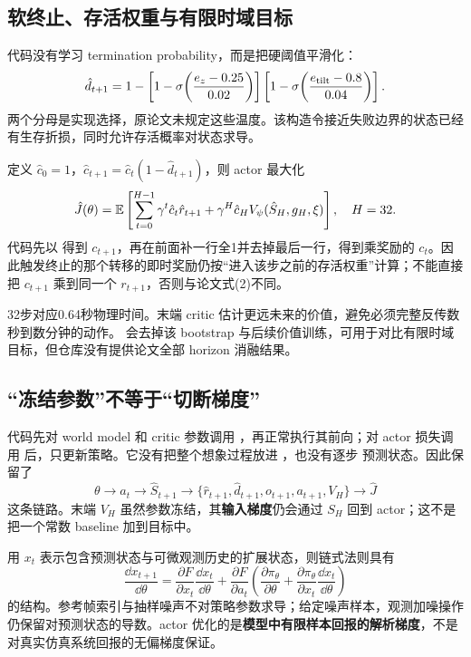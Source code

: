 \subsection{软终止、存活权重与有限时域目标}
代码没有学习 termination probability，而是把硬阈值平滑化：
\begin{equation}
 \hat d_{t+1}=1-
 \left[1-\sigma\!\left(\frac{e_z-0.25}{0.02}\right)\right]
 \left[1-\sigma\!\left(\frac{e_{\rm tilt}-0.8}{0.04}\right)\right].
\end{equation}
两个分母是实现选择，原论文未规定这些温度。该构造令接近失败边界的状态已经有生存折损，同时允许存活概率对状态求导。

定义 $\hat c_0=1$，$\hat c_{t+1}=\hat c_t(1-\hat d_{t+1})$，则 actor 最大化
\begin{equation}\label{eq:actor}
 \hat J(\theta)=\mathbb{E}\left[\sum_{t=0}^{H-1}\gamma^t\hat c_t\hat r_{t+1}
 +\gamma^H\hat c_H V_\psi(\hat S_H,g_H,\xi)\right],\quad H=32.
\end{equation}
代码先以  得到 $c_{t+1}$，再在前面补一行全1并去掉最后一行，得到乘奖励的 $c_t$。因此触发终止的那个转移的即时奖励仍按“进入该步之前的存活权重”计算；不能直接把 $c_{t+1}$ 乘到同一个 $r_{t+1}$，否则与论文式(2)不同。

32步对应0.64秒物理时间。末端 critic 估计更远未来的价值，避免必须完整反传数秒到数分钟的动作。 会去掉该 bootstrap 与后续价值训练，可用于对比有限时域目标，但仓库没有提供论文全部 horizon 消融结果。

\subsection{“冻结参数”不等于“切断梯度”}
代码先对 world model 和 critic 参数调用 ，再正常执行其前向；对 actor 损失调用  后，只更新策略。它没有把整个想象过程放进 ，也没有逐步  预测状态。因此保留了
\begin{equation}
 \theta\longrightarrow a_t\longrightarrow\hat S_{t+1}
 \longrightarrow\{\hat r_{t+1},\hat d_{t+1},o_{t+1},a_{t+1},V_H\}
 \longrightarrow\hat J
\end{equation}
这条链路。末端 $V_H$ 虽然参数冻结，其\textbf{输入梯度}仍会通过 $S_H$ 回到 actor；这不是把一个常数 baseline 加到目标中。

用 $x_t$ 表示包含预测状态与可微观测历史的扩展状态，则链式法则具有
\begin{equation}
 \frac{\dd x_{t+1}}{\dd\theta}=
 \frac{\partial F}{\partial x_t}\frac{\dd x_t}{\dd\theta}
 +\frac{\partial F}{\partial a_t}
 \left(\frac{\partial\pi_\theta}{\partial\theta}
 +\frac{\partial\pi_\theta}{\partial x_t}\frac{\dd x_t}{\dd\theta}\right)
\end{equation}
的结构。参考帧索引与抽样噪声不对策略参数求导；给定噪声样本，观测加噪操作仍保留对预测状态的导数。actor 优化的是\textbf{模型中有限样本回报的解析梯度}，不是对真实仿真系统回报的无偏梯度保证。

